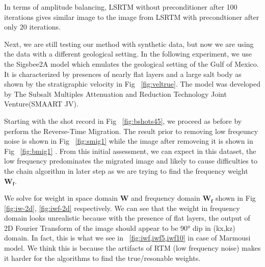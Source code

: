 



In terms of amplitude balancing, LSRTM without preconditioner after 100 iterations gives similar image to the image from LSRTM with precondtioner after only 20 iterations.


Next, we are still testing our method with synthetic data, but now we are using the data with a different geological setting. In the following experiment, we use the Sigsbee2A model which emulates the geological setting of the Gulf of Mexico. It is characterized by presences of nearly flat layers and a large salt body as shown by the stratigraphic velocity in Fig ~\ref{fig:veltrue}. The model was developed by The  Subsalt  Multiples  Attenuation  and  Reduction  Technology  Joint  Venture(SMAART JV).




Starting with the shot record in Fig ~\ref{fig:bshots45}, we proceed as before by perform the Reverse-Time Migration. The result prior to removing low freqeuncy noise is shown in Fig ~\ref{fig:smig1} while the image after removeing it is shown in Fig ~\ref{fig:bmig1} . From this initial assessment, we can expect in this dataset, the low frequency predominates the migrated image and likely to cause difficulties to the chain algorithm in later step as we are trying to find the frequency weight $\mathbf{W_f}$. 



We solve for weight in space domain $\mathbf{W}$ and frequency domain $\mathbf{W_f}$ shown in Fig \ref{fig:iw-2d}, \ref{fig:iwf-2d} respectively. We can see that the weight in frequency domain looks unrealistic because with the presence of flat layers, the output of 2D Fourier Transform of the image should appear to be 90° dip in (kx,kz) domain. In fact, this is what we see in ~\ref{fig:iwf,iwf5,iwf10} in case of Marmousi model. We think this is because the artifacts of RTM (low frequency noise) makes it harder for the algorithms to find the true/resonable weights.


